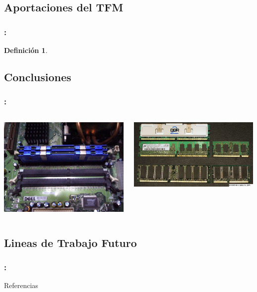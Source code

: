 \documentclass{beamer}
\newtheorem{defi}{Definición}
\begin{document}
\subsection{Aportaciones del TFM}

\begin{frame}
\frametitle{\secname : \subsecname}
 
\begin{defi}

\end{defi}

\end{frame}

\subsection{Conclusiones}

\begin{frame}
\frametitle{\secname : \subsecname}

\begin{columns}
 \begin{column}{6cm}
      \includegraphics [width =0.8 \textwidth ]{figures/slots.jpg}
  \end{column}
  \begin{column}{6cm}
       \includegraphics [width =0.8 \textwidth ]{figures/memram.jpg}
  \end{column}
\end{columns}
\end{frame}


\subsection{Lineas de Trabajo Futuro}

\begin{frame}
\frametitle{\secname : \subsecname}

\end{frame}

\begin{frame}[shrink=30]{Referencias}

\end{frame}
\end{document}
